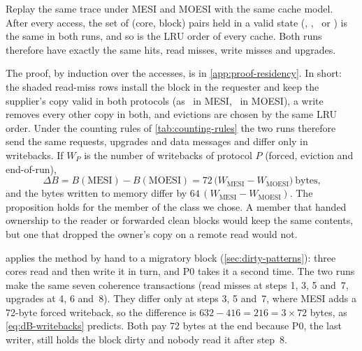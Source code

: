 \begin{proposition}
\label{prop:residency}
Replay the same trace under MESI and MOESI with the same cache model. After every
access, the set of (core, block) pairs held in a valid state (\stM, \stO, \stE\ or
\stS) is the same in both runs, and so is the LRU order of every cache. Both runs
therefore have exactly the same hits, read misses, write misses and upgrades.
\end{proposition}

\noindent The proof, by induction over the accesses, is in
\cref{app:proof-residency}. In short: the shaded read-miss rows install the block
in the requester and keep the supplier's copy valid in both protocols (as \stS\ in
MESI, \stO\ in MOESI), a write removes every other copy in both, and evictions are
chosen by the same LRU order. Under the counting rules of \cref{tab:counting-rules}
the two runs therefore send the same requests, upgrades and data messages and
differ only in writebacks. If $W_P$ is the number of writebacks of protocol $P$
(forced, eviction and end-of-run),
\begin{equation}
  \Delta B = B(\mathrm{MESI}) - B(\mathrm{MOESI}) = 72\,\bigl(W_{\mathrm{MESI}} - W_{\mathrm{MOESI}}\bigr)\ \text{bytes,}
  \label{eq:dB-writebacks}
\end{equation}
and the bytes written to memory differ by $64\,(W_{\mathrm{MESI}} -
W_{\mathrm{MOESI}})$. The proposition holds for the member of the class we chose. A
member that handed ownership to the reader or forwarded clean blocks would keep the
same contents, but one that dropped the owner's copy on a remote read would not.

 applies the method by hand to a migratory block
(\cref{sec:dirty-patterns}): three cores read and then write it in turn, and P0
takes it a second time. The two runs make the same seven coherence transactions
(read misses at steps 1, 3, 5 and~7, upgrades at 4, 6 and~8). They differ only at
steps 3, 5 and~7, where MESI adds a 72-byte forced writeback, so the difference is
$632-416 = 216 = 3\times72$ bytes, as \cref{eq:dB-writebacks} predicts. Both pay
72 bytes at the end because P0, the last writer, still holds the block dirty and
nobody read it after step~8.


